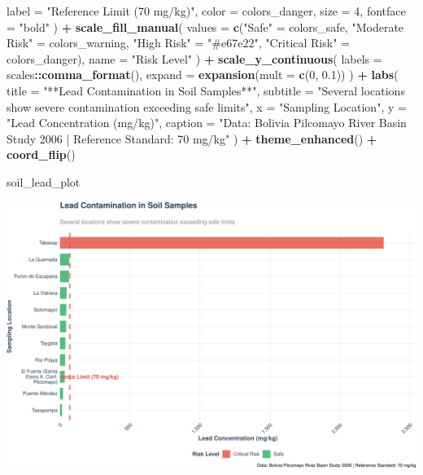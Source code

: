 \documentclass[
]{article}
\newenvironment{Shaded}{\begin{snugshade}}{\end{snugshade}}
\newcommand{\AttributeTok}[1]{\textcolor[rgb]{0.13,0.29,0.53}{#1}}
\newcommand{\DecValTok}[1]{\textcolor[rgb]{0.00,0.00,0.81}{#1}}
\newcommand{\FloatTok}[1]{\textcolor[rgb]{0.00,0.00,0.81}{#1}}
\newcommand{\FunctionTok}[1]{\textcolor[rgb]{0.13,0.29,0.53}{\textbf{#1}}}
\newcommand{\NormalTok}[1]{#1}
\newcommand{\OtherTok}[1]{\textcolor[rgb]{0.56,0.35,0.01}{#1}}
\newcommand{\SpecialCharTok}[1]{\textcolor[rgb]{0.81,0.36,0.00}{\textbf{#1}}}
\newcommand{\StringTok}[1]{\textcolor[rgb]{0.31,0.60,0.02}{#1}}
\begin{document}
\begin{Shaded}
\begin{Highlighting}[]
    \AttributeTok{label =} \StringTok{"Reference Limit (70 mg/kg)"}\NormalTok{,}
    \AttributeTok{color =}\NormalTok{ colors\_danger,}
    \AttributeTok{size =} \DecValTok{4}\NormalTok{,}
    \AttributeTok{fontface =} \StringTok{"bold"}
\NormalTok{  ) }\SpecialCharTok{+}
  \FunctionTok{scale\_fill\_manual}\NormalTok{(}
    \AttributeTok{values =} \FunctionTok{c}\NormalTok{(}\StringTok{"Safe"} \OtherTok{=}\NormalTok{ colors\_safe, }
               \StringTok{"Moderate Risk"} \OtherTok{=}\NormalTok{ colors\_warning, }
               \StringTok{"High Risk"} \OtherTok{=} \StringTok{"\#e67e22"}\NormalTok{, }
               \StringTok{"Critical Risk"} \OtherTok{=}\NormalTok{ colors\_danger),}
    \AttributeTok{name =} \StringTok{"Risk Level"}
\NormalTok{  ) }\SpecialCharTok{+}
  \FunctionTok{scale\_y\_continuous}\NormalTok{(}
    \AttributeTok{labels =}\NormalTok{ scales}\SpecialCharTok{::}\FunctionTok{comma\_format}\NormalTok{(),}
    \AttributeTok{expand =} \FunctionTok{expansion}\NormalTok{(}\AttributeTok{mult =} \FunctionTok{c}\NormalTok{(}\DecValTok{0}\NormalTok{, }\FloatTok{0.1}\NormalTok{))}
\NormalTok{  ) }\SpecialCharTok{+}
  \FunctionTok{labs}\NormalTok{(}
    \AttributeTok{title =} \StringTok{"**Lead Contamination in Soil Samples**"}\NormalTok{,}
    \AttributeTok{subtitle =} \StringTok{"Several locations show severe contamination exceeding safe limits"}\NormalTok{,}
    \AttributeTok{x =} \StringTok{"Sampling Location"}\NormalTok{,}
    \AttributeTok{y =} \StringTok{"Lead Concentration (mg/kg)"}\NormalTok{,}
    \AttributeTok{caption =} \StringTok{"Data: Bolivia Pilcomayo River Basin Study 2006 | Reference Standard: 70 mg/kg"}
\NormalTok{  ) }\SpecialCharTok{+}
  \FunctionTok{theme\_enhanced}\NormalTok{() }\SpecialCharTok{+}
  \FunctionTok{coord\_flip}\NormalTok{()}

\NormalTok{soil\_lead\_plot}
\end{Highlighting}
\end{Shaded}

\includegraphics{WHO_standards_pdf_02_files/figure-latex/soil-lead-1.pdf}
\end{document}
